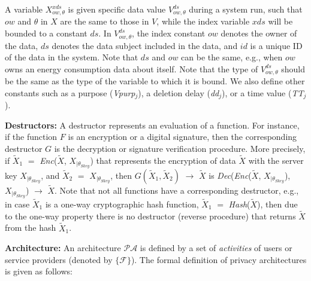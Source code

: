 \documentclass[a4paper]{article}
\begin{document}
A variable $X^{xds}_{ow,\theta}$  is given specific data value $V^{ds}_{ow,\theta}$ during a system run, such that $ow$ and  $\theta$ in $X$ are the same to those in $V$, while the index variable $xds$ will be bounded to a constant $ds$. In $V^{ds}_{ow, \theta}$, the index constant $ow$ denotes the owner of the data, $ds$ denotes the data subject included in the data, and $id$ is a unique ID of the data in the system.  Note that $ds$ and $ow$ can be the same, e.g., when $ow$ owns an energy consumption data about itself. Note that the type of $V^{ds}_{ow, \theta}$ should be the same as   the type of the variable to which it is bound. We also define other constants such as a purpose (\textit{Vpurp}$_j$), a deletion delay (\textit{dd}$_j$), or a time value (\textit{TT}$_j$). 

\textbf{Destructors:} A destructor represents an evaluation of a function. For instance, if the function $F$ is an encryption or a digital signature, then the corresponding destructor $G$ is the decryption or signature verification procedure. More precisely, if $\tilde{X}_1$ $=$ \textit{Enc}($\tilde{X}$, $X_{|\theta_{Skey}}$) that represents the encryption of data $\tilde{X}$ with the server key $X_{|\theta_{Skey}}$, and $\tilde{X}_2$ $=$ $X_{|\theta_{Skey}}$, then $G(\tilde{X}_1, \tilde{X}_2)$ $\rightarrow$ $\tilde{X}$ is \textit{Dec}(\textit{Enc}($\tilde{X}$, $X_{|\theta_{Skey}}$), $X_{|\theta_{Skey}}$) $\rightarrow$ $\tilde{X}$.  Note that not all functions have a corresponding destructor, e.g., in case $\tilde{X}_1$ is a one-way cryptographic hash function, $\tilde{X}_1$ $=$ \textit{Hash}($\tilde{X}$), then due to the one-way property there is no destructor (reverse procedure) that returns 
$\tilde{X}$ from the hash $\tilde{X}_1$.           




\textbf{Architecture:} An architecture $\mathcal{P}\mathcal{A}$ is defined by a set of \textit{activities} of users or service providers  
(denoted by $\{\mathcal{F}\}$). The formal definition of privacy architectures is given as follows: 
\end{document}
